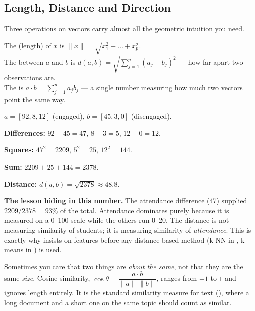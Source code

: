 \subsection{Length, Distance and Direction}

Three operations on vectors carry almost all the geometric intuition you need.

\begin{definitionbox}
The  (length) of $x$ is $\|x\| = \sqrt{x_1^2 + \dots + x_p^2}$.\\[2pt]
The  between $a$ and $b$ is
$d(a,b) = \sqrt{\sum_{j=1}^{p}(a_j - b_j)^2}$ --- how far apart two observations are.\\[2pt]
The  is $a \cdot b = \sum_{j=1}^{p} a_j b_j$ --- a single number
measuring how much two vectors point the same way.
\end{definitionbox}

\begin{worked}
$a = [92, 8, 12]$ (engaged), $b = [45, 3, 0]$ (disengaged).

\smallskip
\textbf{Differences:} $92-45 = 47$, \quad $8-3 = 5$, \quad $12-0 = 12$.

\textbf{Squares:} $47^2 = 2209$, \quad $5^2 = 25$, \quad $12^2 = 144$.

\textbf{Sum:} $2209 + 25 + 144 = 2378$.

\textbf{Distance:} $d(a,b) = \sqrt{2378} \approx 48.8$.

\smallskip
\textbf{The lesson hiding in this number.} The attendance difference (47) supplied
$2209/2378 = 93\%$ of the total. Attendance dominates purely because it is measured
on a 0--100 scale while the others run 0--20. The distance is not measuring
similarity of students; it is measuring similarity of \emph{attendance}. This is
exactly why  insists on  features before any
distance-based method (k-NN in , k-means in
) is used.
\end{worked}

\begin{conceptbox}
Sometimes you care that two things are \emph{about the same}, not that they are the
same \emph{size}. Cosine similarity,
$\cos\theta = \dfrac{a \cdot b}{\|a\|\,\|b\|}$, ranges from $-1$ to $1$ and ignores
length entirely. It is the standard similarity measure for text
(), where a long document and a short one on the same topic should count
as similar.
\end{conceptbox}

